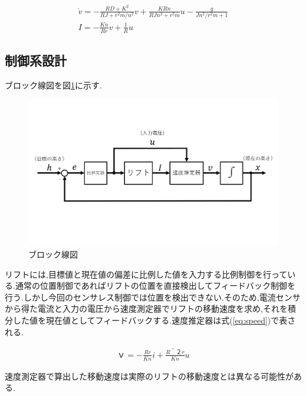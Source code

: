 \begin{eqnarray}
\dot{v}=-\frac{RD+K^2}{RJ+r^{2}m/n^2}v+\frac{KRn}{RJn^{2}+r^{2}m}u-\frac{g}{Jn^{2}/r^{2}m+1}\\
I=-\frac{Kn}{Rr}v+\frac{1}{R}u
\label{eq:system}
\end{eqnarray}


\subsection{制御系設計}ブロック線図を図\ref{fig:blocksenzu}に示す.

\begin{figure}[htbp]
  \begin{center}
    \includegraphics[width=130mm]{img/blocksenzu.png}
    \end{center}
  \caption{ブロック線図}
 \label{fig:blocksenzu}
\end{figure}

リフトには,目標値と現在値の偏差に比例した値を入力する比例制御を行っている.通常の位置制御であればリフトの位置を直接検出してフィードバック制御を行う.しかし今回のセンサレス制御では位置を検出できない.そのため,電流センサから得た電流と入力の電圧から速度測定器でリフトの移動速度を求め,それを積分した値を現在値としてフィードバックする.速度推定器は式(\ref{eq:speed})で表される.

\begin{eqnarray}
ｖ=-\frac{Rr}{Kn}i+\frac{R＾２r}{Kn}u
\label{eq:speed}
\end{eqnarray}

速度測定器で算出した移動速度は実際のリフトの移動速度とは異なる可能性がある.
